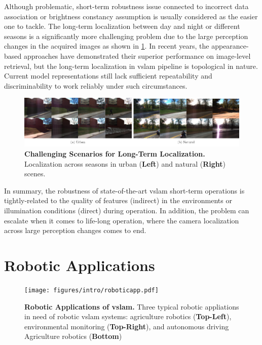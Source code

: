 Although problematic, short-term robustness issue connected to incorrect data association or brightness constancy assumption is usually considered as the easier one to tackle.
The long-term localization between day and night or different seasons is a significantly more challenging problem due to the large perception changes in the acquired images as shown in \ref{fig:intro_locfailures}. 
In recent years, the appearance-based approaches have demonstrated their superior performance on image-level retrieval, but the long-term localization in \acrshort{vslam} pipeline is topological in nature.
Current model representations still lack sufficient repeatability and discriminability to work reliably under such circumstances.  

\begin{figure}[t]
    \centering
	\includegraphics[width=1.0\textwidth]{figures/intro/locfailures.pdf}
	\caption[Challenging Scenarios for Long-Term Localization]{\textbf{Challenging Scenarios for Long-Term Localization.} Localization across seasons in urban (\textbf{Left}) and natural (\textbf{Right}) scenes.
	\label{fig:intro_locfailures}}
\end{figure}

In summary, the robustness of state-of-the-art \acrshort{vslam} short-term operations is tightly-related to the quality of features (indirect) in the environments or illumination conditions (direct) during operation. 
In addition, the problem can escalate when it comes to life-long operation, where the camera localization across large perception changes comes to end. 

\section{Robotic Applications}
\label{sec:intro_applications}

\begin{figure}[t]
    \centering
	\texttt{[image: figures/intro/roboticapp.pdf]}
	\caption[Robotic Applications of \acrshort{vslam}]{\textbf{Robotic Applications of \acrshort{vslam}.} Three typical robotic appliations in need of robotic \acrshort{vslam} systems: agriculture robotics (\textbf{Top-Left}), environmental monitoring (\textbf{Top-Right}), and autonomous driving Agriculture robotics (\textbf{Bottom})
	\label{fig:intro_roboticapp}}
\end{figure}

